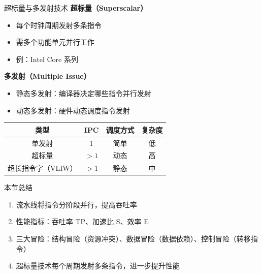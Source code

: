 \documentclass[10pt, aspectratio=169]{beamer}
\begin{document}
\begin{frame}{超标量与多发射技术}
    \textbf{超标量（Superscalar）}
    \begin{itemize}
        \item 每个时钟周期发射多条指令
        \item 需多个功能单元并行工作
        \item 例：Intel Core 系列
    \end{itemize}
    \vspace{0.3em}
    \textbf{多发射（Multiple Issue）}
    \begin{itemize}
        \item 静态多发射：编译器决定哪些指令并行发射
        \item 动态多发射：硬件动态调度指令发射
    \end{itemize}
    \vspace{0.3em}
    \begin{center}
        \begin{tabular}{c|c|c|c}
            \textbf{类型} & \textbf{IPC} & \textbf{调度方式} & \textbf{复杂度} \\
            \hline
            单发射 & 1 & 简单 & 低 \\
            超标量 & $>1$ & 动态 & 高 \\
            超长指令字（VLIW） & $>1$ & 静态 & 中 \\
        \end{tabular}
    \end{center}
\end{frame}

\begin{frame}{本节总结}
    \begin{enumerate}
        \item 流水线将指令分阶段并行，提高吞吐率
        \item 性能指标：吞吐率 TP、加速比 S、效率 E
        \item 三大冒险：结构冒险（资源冲突）、数据冒险（数据依赖）、控制冒险（转移指令）
        \item 超标量技术每个周期发射多条指令，进一步提升性能
    \end{enumerate}
\end{frame}
\end{document}
